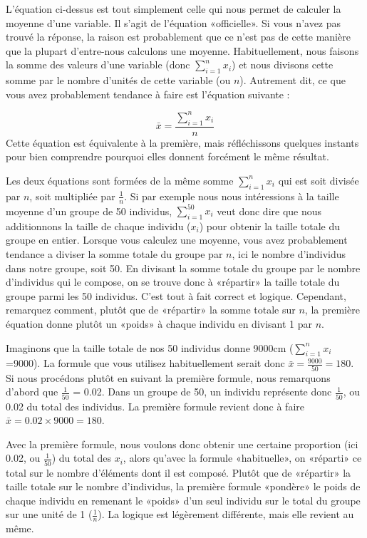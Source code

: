 \documentclass[
]{book}
\begin{document}
L'équation ci-dessus est tout simplement celle qui nous permet de calculer la moyenne d'une variable. Il s'agit de l'équation «officielle». Si vous n'avez pas trouvé la réponse, la raison est probablement que ce n'est pas de cette manière que la plupart d'entre-nous calculons une moyenne. Habituellement, nous faisons la somme des valeurs d'une variable (donc \(\sum_{ i=1 }^{ n }{ x_i }\)) et nous divisons cette somme par le nombre d'unités de cette variable (ou \(n\)). Autrement dit, ce que vous avez probablement tendance à faire est l'équation suivante :

\[\bar{x} = \frac { \sum_{ i=1 }^{ n }{ x_i } }{ n }\]
Cette équation est équivalente à la première, mais réfléchissons quelques instants pour bien comprendre pourquoi elles donnent forcément le même résultat.

Les deux équations sont formées de la même somme \(\sum_{ i=1 }^{ n }{ x_i }\) qui est soit divisée par \(n\), soit multipliée par \(\frac { 1 }{ n }\). Si par exemple nous nous intéressions à la taille moyenne d'un groupe de 50 individus, \(\sum_{ i=1 }^{ 50 }{ x_i }\) veut donc dire que nous additionnons la taille de chaque individu (\(x_i\)) pour obtenir la taille totale du groupe en entier. Lorsque vous calculez une moyenne, vous avez probablement tendance a diviser la somme totale du groupe par \(n\), ici le nombre d'individus dans notre groupe, soit 50. En divisant la somme totale du groupe par le nombre d'individus qui le compose, on se trouve donc à «répartir» la taille totale du groupe parmi les 50 individus. C'est tout à fait correct et logique. Cependant, remarquez comment, plutôt que de «répartir» la somme totale sur \(n\), la première équation donne plutôt un «poids» à chaque individu en divisant 1 par \(n\).

Imaginons que la taille totale de nos 50 individus donne 9000cm (\(\sum_{ i=1 }^{ n }{ x_i }\)=9000). La formule que vous utilisez habituellement serait donc \(\bar{x}= \frac{9000}{50} = 180\). Si nous procédons plutôt en suivant la première formule, nous remarquons d'abord que \(\frac{1}{50}\) = 0.02. Dans un groupe de 50, un individu représente donc \(\frac{1}{50}\), ou 0.02 du total des individus. La première formule revient donc à faire \(\bar{x}= 0.02 \times 9000 = 180\).

Avec la première formule, nous voulons donc obtenir une certaine proportion (ici 0.02, ou \(\frac{1}{50}\)) du total des \(x_i\), alors qu'avec la formule «habituelle», on «réparti» ce total sur le nombre d'éléments dont il est composé. Plutôt que de «répartir» la taille totale sur le nombre d'individus, la première formule «pondère» le poids de chaque individu en remenant le «poids» d'un seul individu sur le total du groupe sur une unité de 1 (\(\frac{1}{n}\)). La logique est légèrement différente, mais elle revient au même.
\end{document}

